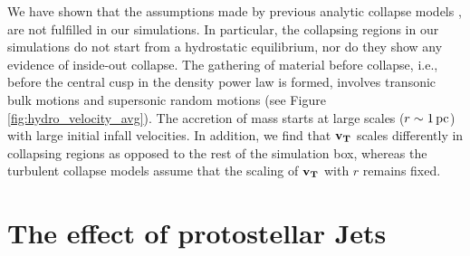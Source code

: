 \documentclass[../dissertation.tex]{subfiles}
\begin{document}
We have shown that the assumptions made by previous analytic collapse models
\citep{1977ApJ...214..488S,1992ApJ...396..631M,1997ApJ...476..750M,2003ApJ...585..850M}, 
are not fulfilled in our simulations.  In particular, 
the collapsing regions in our simulations do not start from a hydrostatic equilibrium, nor 
do they show any evidence of inside-out collapse.  The gathering of material before collapse, i.e.,
before the central cusp in the density power law is formed, involves transonic bulk motions 
and supersonic random motions (see Figure \ref{fig:hydro_velocity_avg}). The accretion of mass starts at large 
scales ($r\sim 1\,\rm pc$) with large initial infall velocities.  In addition, we find that $\mathbf{v_T}$ 
scales differently in collapsing regions as opposed to the rest of the simulation box, 
whereas the turbulent collapse models \citep{1997ApJ...476..750M,2003ApJ...585..850M} assume 
that the scaling of $\mathbf{v_T}$ with $r$ remains fixed.  


\section{The effect of protostellar Jets}
\end{document}
